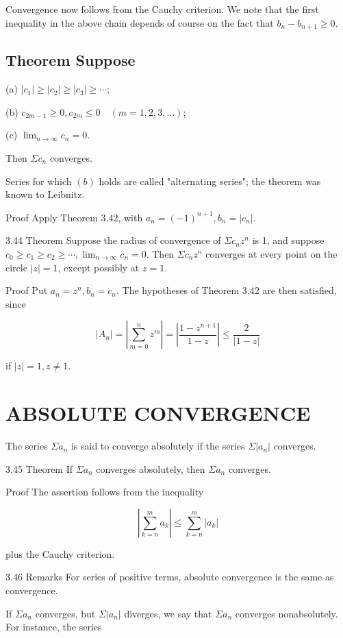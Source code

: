 \documentclass[10pt]{article}
\begin{document}
Convergence now follows from the Cauchy criterion. We note that the first inequality in the above chain depends of course on the fact that $b_{n}-b_{n+1} \geq 0$.

\subsection{Theorem Suppose}
(a) $\left|c_{1}\right| \geq\left|c_{2}\right| \geq\left|c_{3}\right| \geq \cdots$;

(b) $c_{2 m-1} \geq 0, c_{2 m} \leq 0 \quad(m=1,2,3, \ldots)$;

(c) $\lim _{n \rightarrow \infty} c_{n}=0$.

Then $\Sigma c_{n}$ converges.

Series for which $(b)$ holds are called "alternating series"; the theorem was known to Leibnitz.

Proof Apply Theorem 3.42, with $a_{n}=(-1)^{n+1}, b_{n}=\left|c_{n}\right|$.

3.44 Theorem Suppose the radius of convergence of $\Sigma c_{n} z^{n}$ is 1, and suppose $c_{0} \geq c_{1} \geq c_{2} \geq \cdots, \lim _{n \rightarrow \infty} c_{n}=0$. Then $\Sigma c_{n} z^{n}$ converges at every point on the circle $|z|=1$, except possibly at $z=1$.

Proof Put $a_{n}=z^{n}, b_{n}=c_{n}$. The hypotheses of Theorem 3.42 are then satisfied, since

$$
\left|A_{n}\right|=\left|\sum_{m=0}^{n} z^{m}\right|=\left|\frac{1-z^{n+1}}{1-z}\right| \leq \frac{2}{|1-z|}
$$

if $|z|=1, z \neq 1$.

\section{ABSOLUTE CONVERGENCE}
The series $\Sigma a_{n}$ is said to converge absolutely if the series $\Sigma\left|a_{n}\right|$ converges.

3.45 Theorem If $\Sigma a_{n}$ converges absolutely, then $\Sigma a_{n}$ converges.

Proof The assertion follows from the inequality

$$
\left|\sum_{k=n}^{m} a_{k}\right| \leq \sum_{k=n}^{m}\left|a_{k}\right|
$$

plus the Cauchy criterion.

3.46 Remarks For series of positive terms, absolute convergence is the same as convergence.

If $\Sigma a_{n}$ converges, but $\Sigma\left|a_{n}\right|$ diverges, we say that $\Sigma a_{n}$ converges nonabsolutely. For instance, the series
\end{document}
